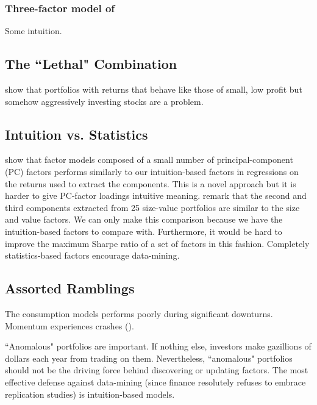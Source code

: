 \subsubsection{Three-factor model of \textcite{fama1993common}}

Some intuition.


\subsection{The ``Lethal" Combination}

\textcite{fama2015five, fama2016choosing, fama2017international} show that portfolios with 
returns that behave like those of small, low profit but somehow aggressively investing stocks 
are a problem.

\subsection{Intuition vs. Statistics}

\textcite{kozak2017interpreting} show that factor models composed of a small number of 
principal-component (PC) factors performs similarly to our intuition-based factors in 
regressions on the returns used to extract the components.
This is a novel approach but it is harder to give PC-factor loadings intuitive meaning.
\textcite{kozak2017interpreting} remark that the second and third components extracted from 25 
size-value portfolios are similar to the size and value factors.
We can only make this comparison because we have the intuition-based factors to compare with.
Furthermore, it would be hard to improve the maximum Sharpe ratio of a set of factors in this 
fashion.
Completely statistics-based factors encourage data-mining.

\subsection{Assorted Ramblings}

The consumption models performs poorly during significant downturns.
Momentum experiences crashes (\parencite{daniel2016momentum}).

``Anomalous" portfolios are important.
If nothing else, investors make gazillions of dollars each year from trading 
on them.
Nevertheless, ``anomalous" portfolios should not be the driving force behind 
discovering or updating factors.
The most effective defense against data-mining (since finance resolutely 
refuses to embrace replication studies) is intuition-based models.

